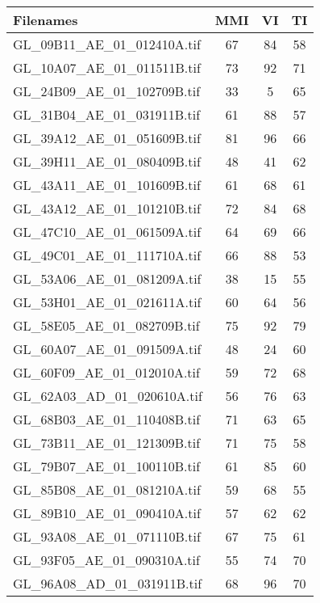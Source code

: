 \begin{tabular}{lccc}
\hline
 Filenames                             & MMI & VI & TI \\ \hline \hline
 GL\_09B11\_AE\_01\_012410A.tif & 67  & 84 & 58 \\
 GL\_10A07\_AE\_01\_011511B.tif & 73  & 92 & 71 \\
 GL\_24B09\_AE\_01\_102709B.tif & 33  & 5  & 65 \\
 GL\_31B04\_AE\_01\_031911B.tif & 61  & 88 & 57 \\
 GL\_39A12\_AE\_01\_051609B.tif & 81  & 96 & 66 \\
 GL\_39H11\_AE\_01\_080409B.tif & 48  & 41 & 62 \\
 GL\_43A11\_AE\_01\_101609B.tif & 61  & 68 & 61 \\
 GL\_43A12\_AE\_01\_101210B.tif & 72  & 84 & 68 \\
 GL\_47C10\_AE\_01\_061509A.tif & 64  & 69 & 66 \\
 GL\_49C01\_AE\_01\_111710A.tif & 66  & 88 & 53 \\
 GL\_53A06\_AE\_01\_081209A.tif & 38  & 15 & 55 \\
 GL\_53H01\_AE\_01\_021611A.tif & 60  & 64 & 56 \\
 GL\_58E05\_AE\_01\_082709B.tif & 75  & 92 & 79 \\
 GL\_60A07\_AE\_01\_091509A.tif & 48  & 24 & 60 \\
 GL\_60F09\_AE\_01\_012010A.tif & 59  & 72 & 68 \\
 GL\_62A03\_AD\_01\_020610A.tif & 56  & 76 & 63 \\
 GL\_68B03\_AE\_01\_110408B.tif & 71  & 63 & 65 \\
 GL\_73B11\_AE\_01\_121309B.tif & 71  & 75 & 58 \\
 GL\_79B07\_AE\_01\_100110B.tif & 61  & 85 & 60 \\
 GL\_85B08\_AE\_01\_081210A.tif & 59  & 68 & 55 \\
 GL\_89B10\_AE\_01\_090410A.tif & 57  & 62 & 62 \\
 GL\_93A08\_AE\_01\_071110B.tif & 67  & 75 & 61 \\
 GL\_93F05\_AE\_01\_090310A.tif & 55  & 74 & 70 \\
 GL\_96A08\_AD\_01\_031911B.tif & 68  & 96 & 70 \\
\hline
\end{tabular}